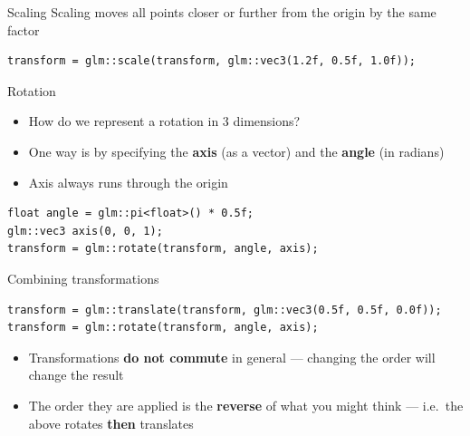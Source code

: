 \begin{frame}[fragile]{Scaling}
	\pause Scaling moves all points closer or further from the origin by the same factor
	\pause \begin{lstlisting}
transform = glm::scale(transform, glm::vec3(1.2f, 0.5f, 1.0f));
	\end{lstlisting}
\end{frame}

\begin{frame}[fragile]{Rotation}
	\begin{itemize}
		\pause\item How do we represent a rotation in 3 dimensions?
		\pause\item One way is by specifying the \textbf{axis} (as a vector) and the \textbf{angle} (in radians)
		\pause\item Axis always runs through the origin
	\end{itemize}
	\pause \begin{lstlisting}
float angle = glm::pi<float>() * 0.5f;
glm::vec3 axis(0, 0, 1);
transform = glm::rotate(transform, angle, axis);
	\end{lstlisting}
\end{frame}

\begin{frame}[fragile]{Combining transformations}
	\pause \begin{lstlisting}
transform = glm::translate(transform, glm::vec3(0.5f, 0.5f, 0.0f));
transform = glm::rotate(transform, angle, axis);
	\end{lstlisting}
	\begin{itemize}
		\pause\item Transformations \textbf{do not commute} in general ---
			changing the order will change the result
		\pause\item The order they are applied is the \textbf{reverse} of what you might think ---
			i.e.\ the above rotates \textbf{then} translates
	\end{itemize}
\end{frame}

